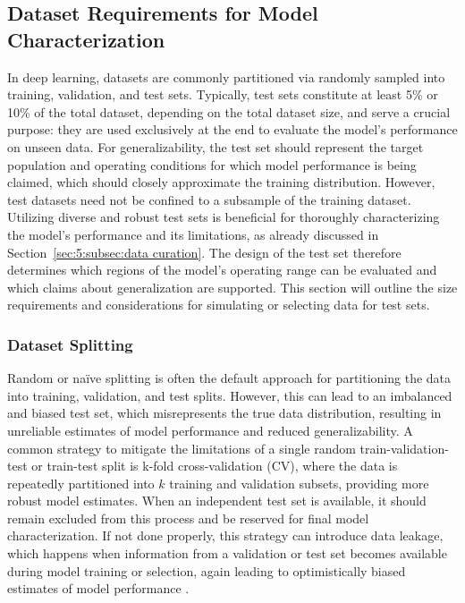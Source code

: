 \subsection{Dataset Requirements for Model Characterization}
\label{sec:dataModel:subsec:data requirements}
In deep learning, datasets are commonly partitioned via randomly sampled into training, validation, and test sets. Typically, test sets constitute at least 5\% or 10\% of the total dataset, depending on the total dataset size, and serve a crucial purpose: they are used exclusively at the end to evaluate the model's performance on unseen data. For generalizability, the test set should represent the target population and operating conditions for which model performance is being claimed, which should closely approximate the training distribution. However, test datasets need not be confined to a subsample of the training dataset. Utilizing diverse and robust test sets is beneficial for thoroughly characterizing the model's performance and its limitations, as already discussed in Section~\ref{sec:5:subsec:data curation}. The design of the test set therefore determines which regions of the model's operating range can be evaluated and which claims about generalization are supported. This section will outline the size requirements and considerations for simulating or selecting data for test sets. 

\subsubsection{Dataset Splitting}
\label{sec:dataModel:subsec:data requirements:subsubsec:data splitting}
Random or na\"{i}ve splitting is often the default approach for partitioning the data into training, validation, and test splits. However, this can lead to an imbalanced and biased test set, which misrepresents the true data distribution, resulting in unreliable estimates of model performance and reduced generalizability. A common strategy to mitigate the limitations of a single random train-validation-test or train-test split is k-fold cross-validation (CV), where the data is repeatedly partitioned into $k$ training and validation subsets, providing more robust model estimates. When an independent test set is available, it should remain excluded from this process and be reserved for final model characterization. If not done properly, this strategy can introduce data leakage, which happens when information from a validation or test set becomes available during model training or selection, again leading to optimistically biased estimates of model performance \cite{Brookshire2024, Igwe2026}. 

